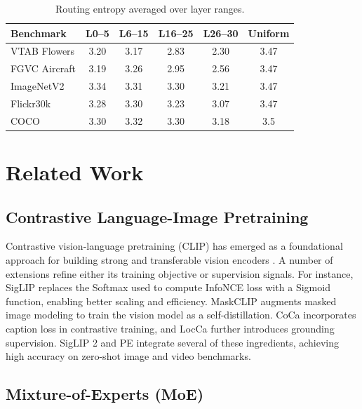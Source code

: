 \documentclass[runningheads]{llncs}
\begin{document}
\begin{table}[H]
\centering
\caption{Routing entropy averaged over layer ranges.}
\label{routing_entropy}
\fontsize{6.5}{8}\selectfont
\setlength{\tabcolsep}{2.7pt}
\newcommand{\gc}{\cellcolor{gray!10}}
\begin{tabular}{lccccc}
\toprule
Benchmark & L0--5 & L6--15 & L16--25 & L26--30&Uniform \\
\midrule
VTAB Flowers \cite{flowers}   & 3.20 & 3.17 & 2.83 & 2.30 & 3.47 \\
FGVC Aircraft \cite{aircraft}  & 3.19 & 3.26 & 2.95 & 2.56 & 3.47 \\
ImageNetV2 \cite{imagenetv2}     & 3.34 & 3.31 & 3.30 & 3.21 & 3.47 \\
Flickr30k \cite{flickr}      & 3.28 & 3.30 & 3.23 & 3.07 & 3.47 \\
COCO \cite{coco}  & 3.30 & 3.32 & 3.30 & 3.18 & 3.5 \\
\bottomrule
\end{tabular}
\end{table}

\section{Related Work}


\subsection{Contrastive Language-Image Pretraining}

Contrastive vision-language pretraining (CLIP) has emerged as a foundational approach for building strong and transferable vision encoders \cite{clip,align}. A number of extensions refine either its training objective or supervision signals. For instance, SigLIP \cite{siglip} replaces the Softmax used to compute InfoNCE loss \cite{infonce} with a Sigmoid function, enabling better scaling and efficiency. MaskCLIP \cite{maskclip} augments masked image modeling to train the vision model as a self-distillation. CoCa \cite{cocca} incorporates caption loss in contrastive training, and LocCa \cite{locca} further introduces grounding supervision. SigLIP 2 \cite{siglip2} and PE \cite{pe} integrate several of these ingredients, achieving high accuracy on zero-shot image and video benchmarks. 

\subsection{Mixture-of-Experts (MoE)}
\end{document}

